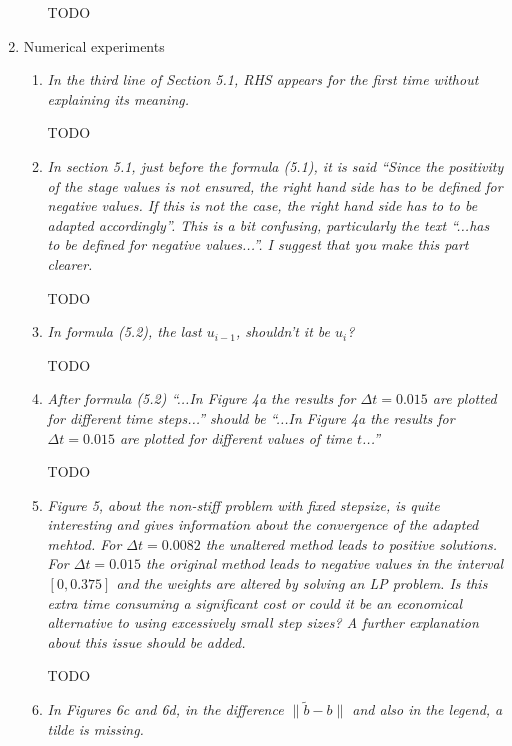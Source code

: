 \documentclass[11pt]{letter}
\newcommand{\revA}[1]{{\color{red}#1}}
\begin{document}
\begin{letter}{}
\begin{enumerate}[label=\arabic*.]
\begin{enumerate}[label=\alph*)]
    \revA{TODO} %
  \end{enumerate}


  \item Numerical experiments
  \begin{enumerate}[label=\alph*)]
    \item \emph{%
    In the third line of Section 5.1, RHS appears for the first time without
    explaining its meaning.
    }

    \revA{TODO} %


    \item \emph{%
    In section 5.1, just before the formula (5.1), it is said ``Since the
    positivity of the stage values is not ensured, the right hand side has to be
    defined for negative values. If this is not the case, the right hand side
    has to to be adapted accordingly''. This is a bit confusing, particularly
    the text ``...has to be defined for negative values...''. I suggest that
    you make this part clearer.
    }

    \revA{TODO} %


    \item \emph{%
    In formula (5.2), the last $u_{i-1}$, shouldn’t it be $u_i$?
    }

    \revA{TODO} %


    \item \emph{%
    After formula (5.2) ``...In Figure 4a the results for $\Delta t = 0.015$
    are plotted for different time steps...'' should be ``...In Figure 4a the
    results for $\Delta t = 0.015$ are plotted for different values of time $t$...''
    }

    \revA{TODO} %


    \item \emph{%
    Figure 5, about the non-stiff problem with fixed stepsize, is quite interesting
    and gives information about the convergence of the adapted mehtod. For
    $\Delta t = 0.0082$ the unaltered method leads to positive solutions. For
    $\Delta t = 0.015$ the original method leads to negative values in the
    interval $[0, 0.375]$ and the weights are altered by solving an LP problem.
    Is this extra time consuming a significant cost or could it be an economical
    alternative to using excessively small step sizes? A further explanation
    about this issue should be added.
    }

    \revA{TODO} %


    \item \emph{%
    In Figures 6c and 6d, in the difference $\| \tilde b - b \|$ and also in the
    legend, a tilde is missing.
    }


\end{enumerate}
\end{enumerate}
\end{letter}
\end{document}
